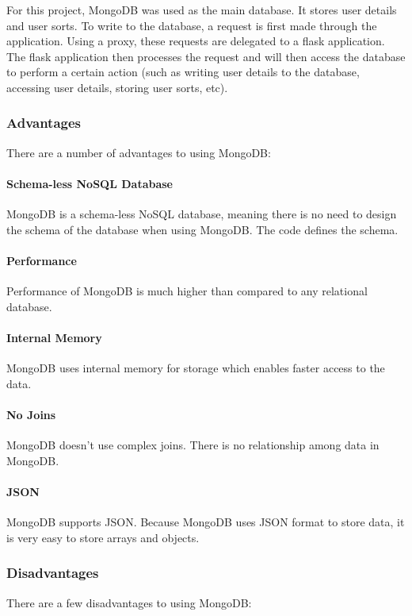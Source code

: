 For this project, MongoDB was used as the main database. It stores user details and user sorts. To write to the database, a request is first made through the application. Using a proxy, these requests are delegated to a flask application. The flask application then processes the request and will then access the database to perform a certain action (such as writing user details to the database, accessing user details, storing user sorts, etc). 

\subsubsection{Advantages}
There are a number of advantages to using MongoDB:

\paragraph{Schema-less NoSQL Database}
MongoDB is a schema-less NoSQL database, meaning there is no need to design the schema of the database when using MongoDB. The code defines the schema.

\paragraph{Performance}
Performance of MongoDB is much higher than compared to any relational database.

\paragraph{Internal Memory}
MongoDB uses internal memory for storage which enables faster access to the data.

\paragraph{No Joins}
MongoDB doesn't use complex joins. There is no relationship among data in MongoDB.

\paragraph{JSON}
MongoDB supports JSON. Because MongoDB uses JSON format to store data, it is very easy to store arrays and objects.

\subsubsection{Disadvantages}
There are a few disadvantages to using MongoDB:

